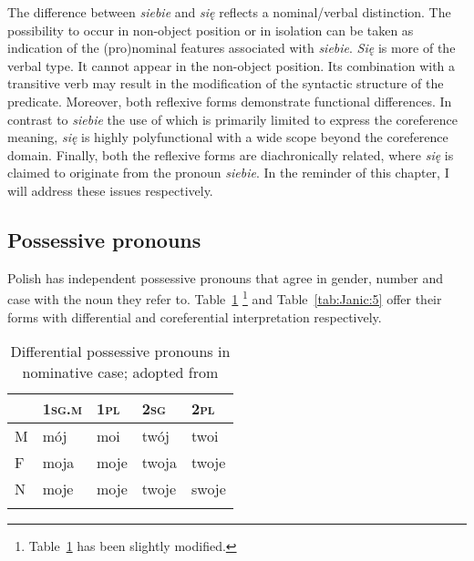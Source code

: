 \documentclass[output=paper]{langscibook}
\begin{document}
The difference between \textit{siebie} and \textit{się} reflects a nominal/verbal distinction. The possibility to occur in non-object position or in isolation can be taken as indication of the (pro)nominal features associated with \textit{siebie}. \textit{Się} is more of the verbal type. It cannot appear in the non-object position. Its combination with a transitive verb may result in the modification of the syntactic structure of the predicate. Moreover, both reflexive forms demonstrate functional differences. In contrast to \textit{siebie} the use of which is primarily limited to express the coreference meaning, \textit{się} is highly polyfunctional with a wide scope beyond the coreference domain. Finally, both the reflexive forms are diachronically related, where \textit{się} is claimed to originate from the pronoun \textit{siebie}. In the reminder of this chapter, I will address these issues respectively. 


\subsection{Possessive pronouns} \label{sec:Janic:2.3}

Polish has independent possessive pronouns that agree in gender, number and case with the noun they refer to. Table~\ref{tab:Janic:4} \footnote{Table~\ref{tab:Janic:4} has been slightly modified.} and Table~\ref{tab:Janic:5} offer their forms with differential and coreferential interpretation respectively.

\begin{table}[ht]
 \centering
 \begin{tabularx}{0.7\textwidth}{XXXXX}
 \lsptoprule
 \textsc{} & \textsc{1sg.m} & \textsc{1pl} & \textsc{2sg} & \textsc{2pl} \\
 \midrule
 \textsc{M} & mój	& moi	 & twój	& twoi\\
 \textsc{F} & moja	& moje & twoja	& twoje\\
 \textsc{N} & moje	& moje	& twoje	& swoje\\
 \lspbottomrule
 \end{tabularx}
 \caption{Differential possessive pronouns in nominative case; adopted from \citet[519]{Wiemer2007}}
 \label{tab:Janic:4}
\end{table}
\end{document}

